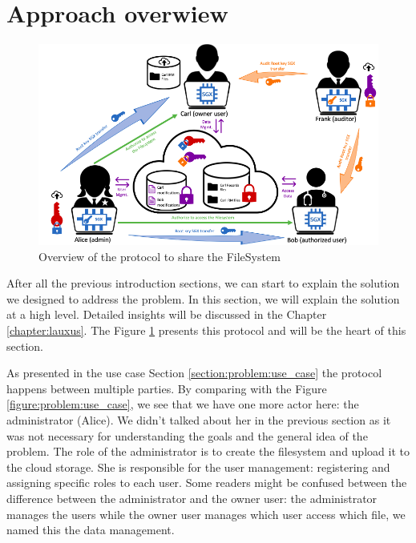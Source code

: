 \documentclass[../main.tex]{subfiles}
\begin{document}
\section{Approach overwiew}
\label{section:problem:approach}
% 
\begin{figure}[h]
    \centering
    \includegraphics[width=\textwidth]{../../images/problem/approach}
    
    \label{figure:problem:approach}
    \caption{Overview of the protocol to share the FileSystem}
\end{figure}

\par After all the previous introduction sections, we can start to explain the solution we designed to address the problem. In this section, we will explain the solution at a high level. Detailed insights will be discussed in the Chapter \ref{chapter:lauxus}. The Figure \ref{figure:problem:approach} presents this protocol and will be the heart of this section.
\par As presented in the use case Section \ref{section:problem:use_case} the protocol happens between multiple parties. By comparing with the Figure \ref{figure:problem:use_case}, we see that we have one more actor here: the administrator (Alice). We didn't talked about her in the previous section as it was not necessary for understanding the goals and the general idea of the problem. The role of the administrator is to create the filesystem and upload it to the cloud storage. She is responsible for the user management: registering and assigning specific roles to each user. Some readers might be confused between the difference between the administrator and the owner user: the administrator manages the users while the owner user manages which user access which file, we named this the data management.\\
\end{document}
